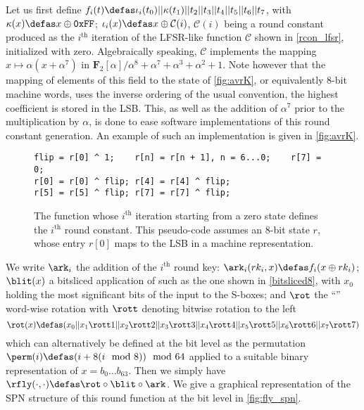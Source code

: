 Let us first define $f_i(t) \defas \iota_i(t_0)||\kappa(t_1)||t_2||t_3||t_4||t_5||t_6||t_7$, with $\kappa(x) \defas x \oplus \texttt{0xFF}$;
$\iota_i(x) \defas x \oplus \mathcal{C}(i)$,
$\mathcal{C}(i)$ being a round constant produced as the $i^\text{th}$ iteration of the LFSR-like function $\mathcal{C}$ shown in
\autoref{rcon_lfsr}, initialized with zero. Algebraically speaking, $\mathcal{C}$ implements the mapping $x \mapsto \alpha(x + \alpha^7)$
in $\mathbf{F}_2[\alpha]/\alpha^8+\alpha^7+\alpha^3+\alpha^2+1$. Note however that the mapping of elements of this field to the state of
\autoref{fig:avrK}, or equivalently 8-bit machine words, uses the inverse ordering of the usual convention, \ie{} the highest coefficient is
stored in the LSB. This, as well as the addition of $\alpha^7$ prior to the multiplication by $\alpha$, is done to ease software implementations
of this round constant generation. An example of such an implementation is given in
\autoref{fig:avrK}.
\begin{figure}[ht]
\begin{verbatim}
flip = r[0] ^ 1;    r[n] = r[n + 1], n = 6...0;    r[7] = 0;
r[0] = r[0] ^ flip; r[4] = r[4] ^ flip;
r[5] = r[5] ^ flip; r[7] = r[7] ^ flip;
\end{verbatim}
\caption[The round-constant-generating function.]{The function whose $i^\text{th}$ iteration starting from a zero state defines the $i^\text{th}$ round constant. This pseudo-code
assumes an 8-bit state $r$, whose entry $r[0]$ maps to the LSB in a machine representation\label{rcon_lfsr}.}
\end{figure}

We write $\ark_i$ the addition of the $i^\text{th}$ round key: $\ark_i(rk_i, x) \defas f_i(x \oplus rk_i)$;
$\blit(x)$ a bitsliced application of
\littlunOne such as \eg the one shown in \autoref{bitsliced8}, with $x_0$ holding the most significant bits of the input to the S-boxes;
and $\rot$ the ``\shiftrow'' word-wise rotation with $\rott$ denoting bitwise rotation to the left
\[
\rot(x) \defas (x_0||x_1 \rott 1||x_2 \rott 2||x_3 \rott 3||x_4 \rott 4||x_5 \rott 5||x_6 \rott 6||x_7 \rott 7)
\]
which can alternatively be defined at the bit level as the permutation $\perm(i) \defas (i + 8(i \mod 8)) \mod 64$
applied to a suitable binary representation of $x = b_0\ldots b_{63}$. Then we simply have
$\rfly(\cdot,\cdot) \defas \rot \circ \blit \circ \ark$.
We give a graphical representation of the SPN structure of this round function at the bit level in \autoref{fig:fly_spn}.

